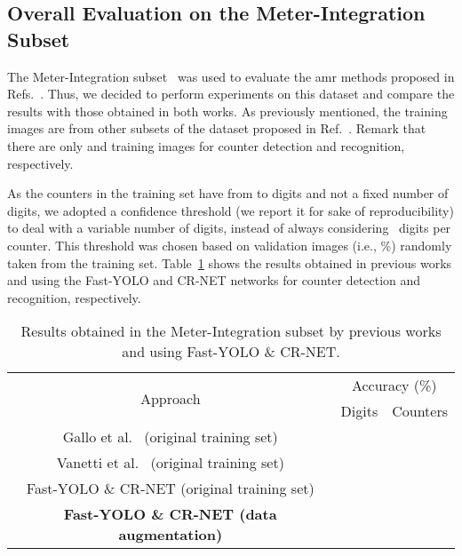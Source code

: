 \subsection{Overall Evaluation on the Meter-Integration Subset}

The Meter-Integration subset~\cite{vanetti2013gas} was used to evaluate the \gls*{amr} methods proposed in Refs.~. Thus, we decided to perform experiments on this dataset and compare the results with those obtained in both works. As previously mentioned, the training images are from other subsets of the dataset proposed in Ref.~. Remark that there are only  and  training images for counter detection and recognition, respectively.

 As the counters in the training set have from  to  digits and not a fixed number of digits, we adopted a  confidence threshold (we report it for sake of reproducibility) to deal with a variable number of digits, instead of always considering~ digits per counter.
This threshold was chosen based on  validation images (i.e., \%) randomly taken from the training set.
Table~\ref{tab:results_overall} shows the results obtained in previous works and using the Fast-YOLO and CR-NET networks for counter detection and recognition, respectively.

\vspace{2mm}
\begin{table}[!htb]
\caption{Results obtained in the Meter-Integration subset by previous works and using Fast-YOLO \& CR-NET.}
\label{tab:results_overall}
\vspace{-2mm}
\begin{center}
\begin{tabular}{@{}ccc@{}}
\toprule
\multicolumn{1}{c}{\multirow{2}{*}{Approach}} & \multicolumn{2}{c}{Accuracy (\%)} \\
\multicolumn{1}{c}{} & Digits & Counters \\ \midrule
Gallo et al.~\cite{gallo2015robust} (original training set) &  &  \\
Vanetti et al.~\cite{vanetti2013gas} (original training set) &  &  \\
Fast-YOLO \& CR-NET (original training set) & \REV{} & \REV{} \\ 
\textbf{Fast-YOLO \& CR-NET (data augmentation)} & \REV{} & \REV{} \\ \bottomrule 
 \end{tabular}\end{center}
\end{table}
\vspace{-5mm}

